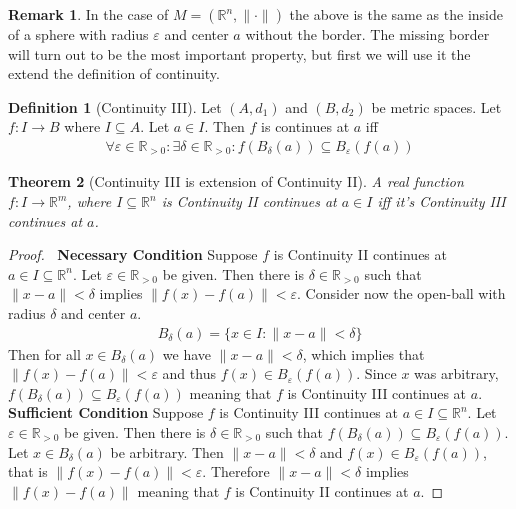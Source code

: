 \documentclass{article}
\theoremstyle{plain}
\newtheorem{theorem}{Theorem}
\theoremstyle{definition}
\newtheorem*{remark}{Remark}
\newtheorem{definition}[theorem]{Definition}
\newcommand{\R}{\mathbb{R}}
\begin{document}
\begin{remark}
	In the case of $M=(\R^n,\|\cdot\|)$ the above is the same as the inside of a
	sphere with radius $\varepsilon$ and center $a$ without the border. The
	missing border will turn out to be the most important property, but first we
	will use it the extend the definition of continuity.
\end{remark}
\begin{definition}[Continuity III]
	Let $(A,d_1)$ and $(B,d_2)$ be metric spaces. Let $f:I\rightarrow B$ where
	$I\subseteq A$. Let $a\in I$. Then $f$ is continues at $a$ iff
	\begin{equation}
	\begin{aligned}
		\forall\varepsilon\in\R_{>0}:\exists\delta\in\R_{>0}:
		f(B_{\delta}(a))\subseteq B_{\varepsilon}(f(a))
	\end{aligned}
	\end{equation}
\end{definition}
\begin{theorem}[Continuity III is extension of Continuity II]
	A real function $f:I\rightarrow\R^m$, where $I\subseteq\R^n$
	is Continuity II continues at $a\in I$ iff it's Continuity III
	continues at $a$.
\end{theorem}
\begin{proof}$\ $\newline
	\textbf{Necessary Condition}\newline
	Suppose $f$ is Continuity II continues at $a\in
	I\subseteq\R^n$. Let $\varepsilon\in\R_{>0}$ be given.
	Then there is $\delta\in\R_{>0}$ such that $\|x-a\|<\delta$
	implies $\|f(x)-f(a)\|<\varepsilon$. Consider now the open-ball
	with radius $\delta$ and center $a$.
	\begin{equation}
	\begin{aligned}
		B_{\delta}(a)=\{x\in I:\|x-a\|<\delta\}
	\end{aligned}
	\end{equation}
	Then for all $x\in B_{\delta}(a)$ we have $\|x-a\|<\delta$, which implies
	that $\|f(x)-f(a)\|<\varepsilon$ and thus $f(x)\in B_{\varepsilon}(f(a))$.
	Since $x$ was arbitrary, $f(B_{\delta}(a))\subseteq B_{\varepsilon}(f(a))$
	meaning that $f$ is Continuity III continues at $a$.
	\newline\newline
\textbf{Sufficient Condition}\newline
	Suppose $f$ is Continuity III continues at $a\in
	I\subseteq\R^n$. Let $\varepsilon\in\R_{>0}$ be given.	Then there
	is $\delta\in\R_{>0}$ such that $f(B_{\delta}(a))\subseteq
	B_{\varepsilon}(f(a))$. Let $x\in B_{\delta}(a)$ be arbitrary. Then
	$\|x-a\|<\delta$ and $f(x)\in B_{\varepsilon}(f(a))$, that is
	$\|f(x)-f(a)\|<\varepsilon$. Therefore $\|x-a\|<\delta$ implies
	$\|f(x)-f(a)\|$ meaning that $f$ is Continuity II continues at $a$.
\end{proof}
\end{document}
